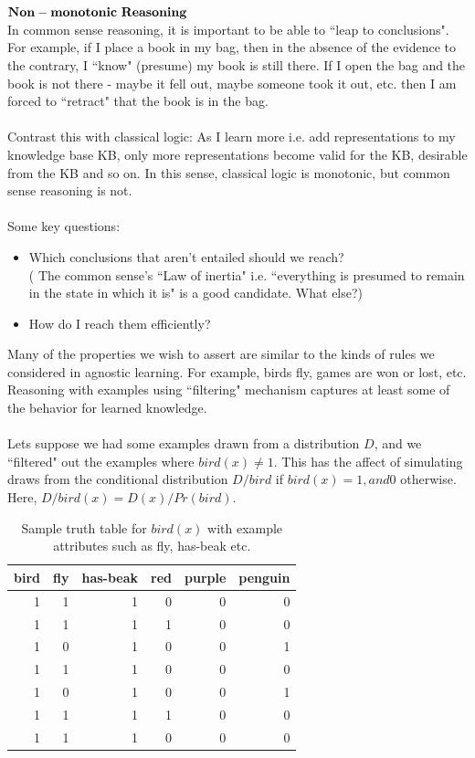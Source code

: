 \documentclass[10pt]{article}
\begin{document}
\\
\\
$\bf{Non-monotonic\ Reasoning}$\\
In common sense reasoning, it is important to be able to ``leap to conclusions". For example, if I place a book in my bag, then in the absence of the evidence to the contrary, I ``know" (presume) my book is still there. If I open the bag and the book is not there - maybe it fell out, maybe someone took it out, etc. then I am forced to ``retract" that the book is in the bag.\\
\\
Contrast this with classical logic: As I learn more i.e. add representations to my knowledge base KB, only more representations become valid for the KB, desirable from the KB and so on. In this sense, classical logic is monotonic, but common sense reasoning is not.\\
\\
Some key questions:
\begin{itemize}
  \item Which conclusions that aren't entailed should we reach?\\
( The common sense's ``Law of inertia" i.e. ``everything is presumed to remain in the state in which it is" is a good candidate. What else?)
\item How do I reach them efficiently?\\
\end{itemize}
Many of the properties we wish to  assert are similar to the kinds of rules we considered in agnostic learning.
For example, birds fly, games are won or lost, etc.
Reasoning with examples using ``filtering" mechanism captures at least some of the behavior for learned knowledge.\\
\\
Lets suppose we had some examples drawn from a distribution $D$, and we ``filtered" out the examples where $bird(x)\ne 1$. This has the affect of simulating draws from the conditional distribution $D/bird$ if $bird(x)=1, and 0$ otherwise. Here, $D/bird(x) = D(x)/Pr(bird)$.
\\
\begin{table}[ht!]
\centering
    \begin{tabular}{|r|r|r|r|r|r|}
    \hline
bird & fly & has-beak & red & purple & penguin\\
   \hline
1&1&1&0&0&0\\
  \hline
1&1&1&1&0&0\\
  \hline
1&0&1&0&0&1\\
  \hline
1&1&1&0&0&0\\
  \hline
1&0&1&0&0&1\\
  \hline
1&1&1&1&0&0\\
  \hline
1&1&1&0&0&0\\
  \hline
  \end{tabular}%
  \caption{Sample truth table for $bird(x)$ with example attributes such as fly, has-beak etc.}
\end{table}%
\end{document}
